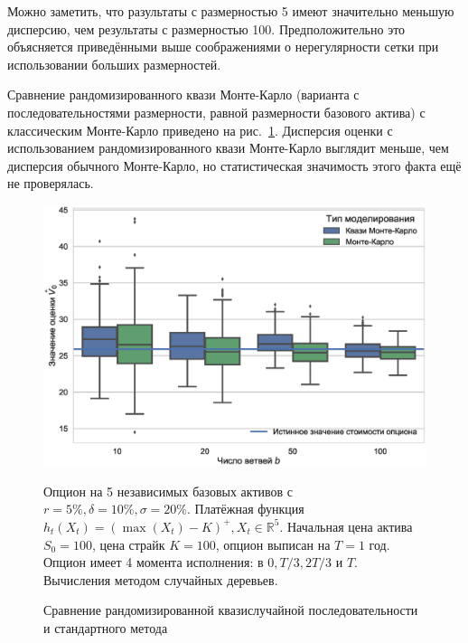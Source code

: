 \documentclass[specialist,
               substylefile = ../spbu.rtx,
               subf,href,colorlinks=true, 10pt]{disser}
\begin{document}
Можно заметить, что разультаты с размерностью 5 имеют значительно меньшую дисперсию, чем результаты с размерностью 100. Предположительно это объясняется приведёнными выше соображениями о нерегулярности сетки при использовании больших размерностей.

Сравнение рандомизированного квази Монте-Карло (варианта с последовательностями размерности, равной размерности базового актива) с классическим Монте-Карло приведено на рис.~\ref{fig:quasi_vs_common_mc}. Дисперсия оценки с использованием рандомизированного квази Монте-Карло выглядит меньше, чем дисперсия обычного Монте-Карло, но статистическая значимость этого факта ещё не проверялась.

\begin{figure}[h]
    \centering
	\includegraphics[width=\textwidth]{quasi_vs_common_mc.eps}
	\caption{Сравнение рандомизированной квазислучайной последовательности и стандартного метода}
	\footnotesize Опцион на 5 независимых базовых активов с $r = 5\%, \delta = 10\%, \sigma = 20\%$. Платёжная функция $h_t(X_t) = \left(\max(X_t) - K\right)^+, X_t\in \mathbb R^5$. Начальная цена актива $S_0 = 100$, цена страйк $K = 100$, опцион выписан на $T=1$ год. Опцион имеет 4 момента исполнения: в $0, T/3, 2T/3$ и $T$. Вычисления методом случайных деревьев.
	\label{fig:quasi_vs_common_mc}
\end{figure}





\printbibliography
\end{document}
